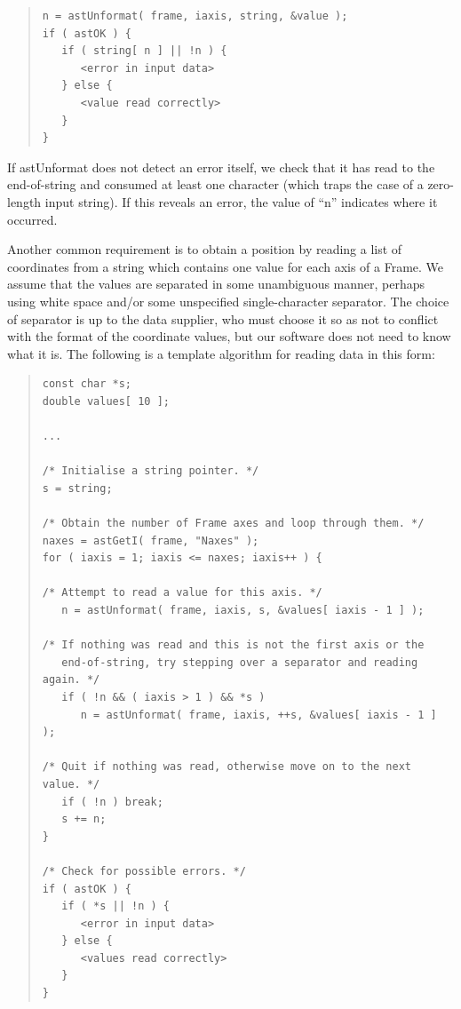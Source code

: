 \documentclass[twoside,11pt]{article}
\begin{document}
\begin{quote}
\small
\begin{verbatim}
n = astUnformat( frame, iaxis, string, &value );
if ( astOK ) {
   if ( string[ n ] || !n ) {
      <error in input data>
   } else {
      <value read correctly>
   }
}
\end{verbatim}
\normalsize
\end{quote}

If astUnformat does not detect an error itself, we check that it has
read to the end-of-string and consumed at least one character (which
traps the case of a zero-length input string). If this reveals an
error, the value of ``n'' indicates where it occurred.

Another common requirement is to obtain a position by reading a list
of coordinates from a string which contains one value for each axis of
a Frame. We assume that the values are separated in some unambiguous
manner, perhaps using white space and/or some unspecified
single-character separator. The choice of separator is up to the data
supplier, who must choose it so as not to conflict with the format of
the coordinate values, but our software does not need to know what it
is. The following is a template algorithm for reading data in this
form:

\begin{quote}
\small
\begin{verbatim}
const char *s;
double values[ 10 ];

...

/* Initialise a string pointer. */
s = string;

/* Obtain the number of Frame axes and loop through them. */
naxes = astGetI( frame, "Naxes" );
for ( iaxis = 1; iaxis <= naxes; iaxis++ ) {

/* Attempt to read a value for this axis. */
   n = astUnformat( frame, iaxis, s, &values[ iaxis - 1 ] );

/* If nothing was read and this is not the first axis or the
   end-of-string, try stepping over a separator and reading again. */
   if ( !n && ( iaxis > 1 ) && *s )
      n = astUnformat( frame, iaxis, ++s, &values[ iaxis - 1 ] );

/* Quit if nothing was read, otherwise move on to the next value. */
   if ( !n ) break;
   s += n;
}

/* Check for possible errors. */
if ( astOK ) {
   if ( *s || !n ) {
      <error in input data>
   } else {
      <values read correctly>
   }
}
\end{verbatim}
\normalsize
\end{quote}
\end{document}
